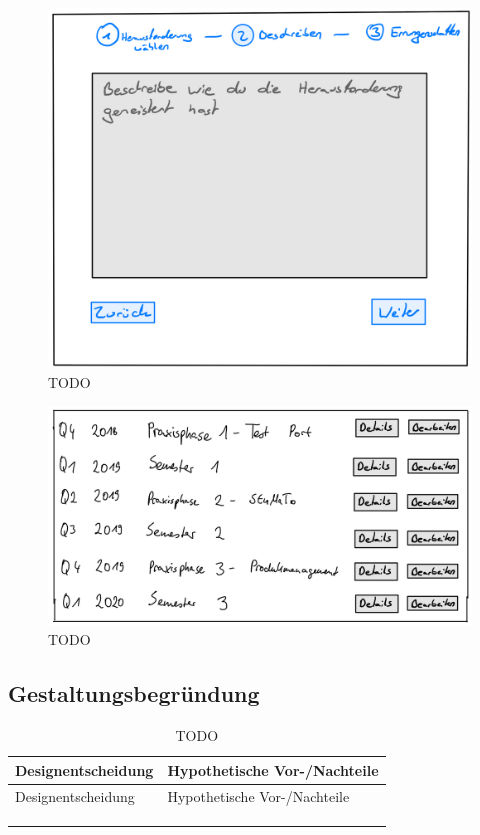 \documentclass[
  12pt,
  ngerman,
  a4paper,
]{article}
\begin{document}
\begin{figure}
\centering
\includegraphics{./tex2pdf.-930e6666e1221838/9dd381bc45486479982ec31dbc21849e8091705e.jpg}
\caption{TODO}
\end{figure}

\begin{figure}
\centering
\includegraphics{./tex2pdf.-930e6666e1221838/63664516007fb411973c4d31668ddd0310bf1fcf.jpg}
\caption{TODO}
\end{figure}

\hypertarget{gestaltungsbegruxfcndung-1}{%
\subsection{Gestaltungsbegründung}\label{gestaltungsbegruxfcndung-1}}

\begin{longtable}[]{@{}ll@{}}
\caption{TODO \label{tbl:claims:info}}\tabularnewline
\toprule
Designentscheidung & Hypothetische Vor-/Nachteile\tabularnewline
\midrule
\endfirsthead
\toprule
Designentscheidung & Hypothetische Vor-/Nachteile\tabularnewline
\midrule
\endhead
&\tabularnewline
&\tabularnewline
&\tabularnewline
\bottomrule
\end{longtable}
\end{document}

